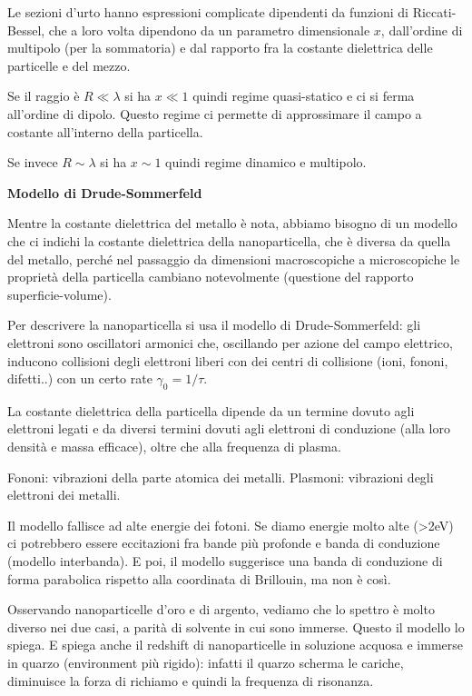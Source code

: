 Le sezioni d'urto hanno espressioni complicate dipendenti da funzioni di
Riccati-Bessel, che a loro volta dipendono da un parametro dimensionale
\(x\), dall'ordine di multipolo (per la sommatoria) e dal rapporto fra
la costante dielettrica delle particelle e del mezzo.

Se il raggio è \(R \ll \lambda\) si ha \(x \ll 1\) quindi regime
quasi-statico e ci si ferma all'ordine di dipolo. Questo regime ci
permette di approssimare il campo a costante all'interno della
particella.

Se invece \(R \sim \lambda\) si ha \(x \sim 1\) quindi regime dinamico e
multipolo.

\textbf{Modello di Drude-Sommerfeld}

Mentre la costante dielettrica del metallo è nota, abbiamo bisogno di un
modello che ci indichi la costante dielettrica della nanoparticella, che
è diversa da quella del metallo, perché nel passaggio da dimensioni
macroscopiche a microscopiche le proprietà della particella cambiano
notevolmente (questione del rapporto superficie-volume).

Per descrivere la nanoparticella si usa il modello di Drude-Sommerfeld:
gli elettroni sono oscillatori armonici che, oscillando per azione del
campo elettrico, inducono collisioni degli elettroni liberi con dei
centri di collisione (ioni, fononi, difetti..) con un certo rate
\(\gamma_{0} = 1/\tau\).

La costante dielettrica della particella dipende da un termine dovuto
agli elettroni legati e da diversi termini dovuti agli elettroni di
conduzione (alla loro densità e massa efficace), oltre che alla
frequenza di plasma.

Fononi: vibrazioni della parte atomica dei metalli. Plasmoni: vibrazioni
degli elettroni dei metalli.

Il modello fallisce ad alte energie dei fotoni. Se diamo energie molto
alte (\textgreater{}2eV) ci potrebbero essere eccitazioni fra bande più
profonde e banda di conduzione (modello interbanda). E poi, il modello
suggerisce una banda di conduzione di forma parabolica rispetto alla
coordinata di Brillouin, ma non è così.

Osservando nanoparticelle d'oro e di argento, vediamo che lo spettro è
molto diverso nei due casi, a parità di solvente in cui sono immerse.
Questo il modello lo spiega. E spiega anche il redshift di
nanoparticelle in soluzione acquosa e immerse in quarzo (environment più
rigido): infatti il quarzo scherma le cariche, diminuisce la forza di
richiamo e quindi la frequenza di risonanza.

